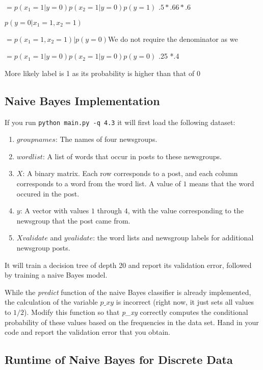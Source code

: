 \documentclass{article}
\def\blu#1{{\color{blu}#1}}
\def\gre#1{{\color{gre}#1}}
\def\red#1{{\color{red}#1}}
\def\enum#1{\begin{enumerate}#1\end{enumerate}}
\begin{document}
\gre{$=p(x_1=1|y=0)p(x_2 = 1|y=0)p(y=1)$}
\gre{$.5*.66*.6$}

\gre{$p(y = 0|x_1 = 1, x_2 = 1)$}

\gre{$=p(x_1 = 1, x_2 = 1)|p(y=0)$}\red{We do not require the denominator as we  }

\gre{$=p(x_1=1|y=0)p(x_2 = 1|y=0)p(y=0)$}
\gre{.25 *.4}
 
\gre{More likely label is 1 as its probability is higher than that of 0} 





\subsection{Naive Bayes Implementation}

If you run \texttt{python main.py \string-q 4.3} it will first load the following dataset:
\enum{
\item $groupnames$: The names of four newsgroups.
\item $wordlist$: A list of words that occur in posts to these newsgroups.
\item $X$: A binary matrix. Each row corresponds to a post, and each column corresponds to a word from the word list. A value of $1$ means that the word occured in the post.
\item $y$: A vector with values $1$ through $4$, with the value corresponding to the newsgroup that the post came from.
\item $Xvalidate$ and $yvalidate$: the word lists and newsgroup labels for additional newsgroup posts.
}
It will train a decision tree of depth 20 and report its validation error, followed by training a naive Bayes model.

While the \emph{predict} function of the naive Bayes classifier is already implemented, the calculation of the variable $p\_xy$ is incorrect (right now, it just sets all values to $1/2$). \blu{Modify this function so that \emph{p\_xy} correctly computes the conditional probability of these values based on the frequencies in the data set. Hand in your code and report the validation error that you obtain.}


\subsection{Runtime of Naive Bayes for Discrete Data}
\end{document}
